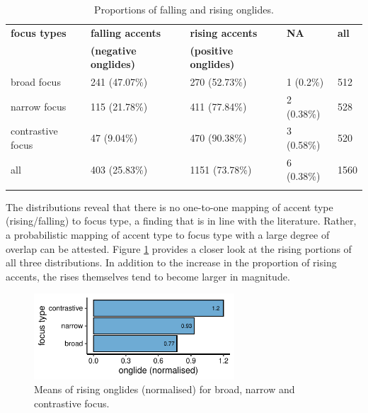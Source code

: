 \begin{table}[!h]
	\caption{Proportions of falling and rising onglides.}
	\begin{tabularx}{\textwidth}{Xllll}
		\lsptoprule
		\textbf{focus types	} &	\textbf{falling accents}&		\textbf{rising accents} &			\textbf{NA} & 	\textbf{all}\\
		&				\textbf{(negative onglides)} &	\textbf{(positive onglides)} &		&			\\	
		\midrule
		broad focus &		241 (47.07\%) & 				270 (52.73\%)  & 					1 (0.2\%) &			512 \\
		\midrule
		narrow focus &		115 (21.78\%)  &				411 (77.84\%) & 					2 (0.38\%)  &			528 \\
		\midrule
		contrastive focus &		47 (9.04\%)  &					470 (90.38\%) &						3 (0.58\%) &			520 \\
		\midrule
		all &				403 (25.83\%) &					1151 (73.78\%)  &					6 (0.38\%) &			1560\\\lspbottomrule
	\end{tabularx}
	\label{tab:props_onglide}
\end{table}
The distributions reveal that there is no one-to-one mapping of accent type (rising/falling) to focus type, a finding that is in line with the literature. Rather, a probabilistic mapping of accent type to focus type with a large degree of overlap can be attested. Figure \ref{fig:onglide_means} provides a closer look at the rising portions of all three distributions. In addition to the increase in the proportion of rising accents, the rises themselves tend to become larger in magnitude. 



\begin{figure}
\includegraphics[width=7.5cm]{figures/ch6/onglide_norm_rising_means.pdf}
\caption{Means of rising onglides (normalised) for broad, narrow and contrastive focus.}
\label{fig:onglide_means}
\end{figure}


